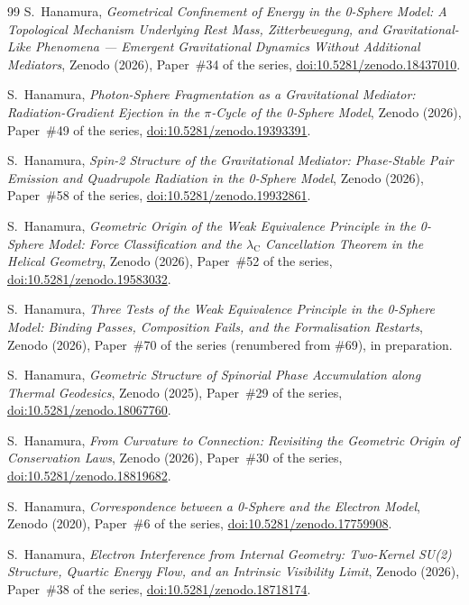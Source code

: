 \documentclass[%
 reprint, amsmath,amssymb, aps, prb, ]{revtex4-2}
\numberwithin{equation}{section}
\begin{document}
\begin{thebibliography}{99}
 S.~Hanamura, \emph{Geometrical Confinement of Energy in the 0-Sphere Model: A Topological Mechanism Underlying Rest Mass, Zitterbewegung, and Gravitational-Like Phenomena --- Emergent Gravitational Dynamics Without Additional Mediators}, Zenodo (2026), Paper~\#34 of the series, \href{https://doi.org/10.5281/zenodo.18437010}{doi:10.5281/zenodo.18437010}.

 S.~Hanamura, \emph{Photon-Sphere Fragmentation as a Gravitational Mediator: Radiation-Gradient Ejection in the $\pi$-Cycle of the 0-Sphere Model}, Zenodo (2026), Paper~\#49 of the series, \href{https://doi.org/10.5281/zenodo.19393391}{doi:10.5281/zenodo.19393391}.

 S.~Hanamura, \emph{Spin-2 Structure of the Gravitational Mediator: Phase-Stable Pair Emission and Quadrupole Radiation in the 0-Sphere Model}, Zenodo (2026), Paper~\#58 of the series, \href{https://doi.org/10.5281/zenodo.19932861}{doi:10.5281/zenodo.19932861}.

 S.~Hanamura, \emph{Geometric Origin of the Weak Equivalence Principle in the 0-Sphere Model: Force Classification and the $\lambda_{\mathrm C}$ Cancellation Theorem in the Helical Geometry}, Zenodo (2026), Paper~\#52 of the series, \href{https://doi.org/10.5281/zenodo.19583032}{doi:10.5281/zenodo.19583032}.

 S.~Hanamura, \emph{Three Tests of the Weak Equivalence Principle in the 0-Sphere Model: Binding Passes, Composition Fails, and the Formalisation Restarts}, Zenodo (2026), Paper~\#70 of the series (renumbered from \#69), in preparation.

 S.~Hanamura, \emph{Geometric Structure of Spinorial Phase Accumulation along Thermal Geodesics}, Zenodo (2025), Paper~\#29 of the series, \href{https://doi.org/10.5281/zenodo.18067760}{doi:10.5281/zenodo.18067760}.

 S.~Hanamura, \emph{From Curvature to Connection: Revisiting the Geometric Origin of Conservation Laws}, Zenodo (2026), Paper~\#30 of the series, \href{https://doi.org/10.5281/zenodo.18819682}{doi:10.5281/zenodo.18819682}.

 S.~Hanamura, \emph{Correspondence between a 0-Sphere and the Electron Model}, Zenodo (2020), Paper~\#6 of the series, \href{https://doi.org/10.5281/zenodo.17759908}{doi:10.5281/zenodo.17759908}.

 S.~Hanamura, \emph{Electron Interference from Internal Geometry: Two-Kernel SU(2) Structure, Quartic Energy Flow, and an Intrinsic Visibility Limit}, Zenodo (2026), Paper~\#38 of the series, \href{https://doi.org/10.5281/zenodo.18718174}{doi:10.5281/zenodo.18718174}.


\end{thebibliography}
\end{document}

